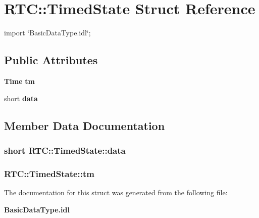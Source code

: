 \section{RTC::TimedState Struct Reference}
\label{structRTC_1_1TimedState}


{\ttfamily import \char`\"{}BasicDataType.idl\char`\"{};}

\subsection*{Public Attributes}
\begin{DoxyCompactItemize}
\item 
{\bf Time} {\bf tm}
\item 
short {\bf data}
\end{DoxyCompactItemize}


\subsection{Member Data Documentation}
\subsubsection[{data}]{\setlength{\rightskip}{0pt plus 5cm}short {\bf RTC::TimedState::data}}\label{structRTC_1_1TimedState_ac5a52665ab3dc6b8d92a68486c93745e}
\subsubsection[{tm}]{ {\bf RTC::TimedState::tm}}\label{structRTC_1_1TimedState_a3d685c8b4f9db1ed6734b7358ab063c8}


The documentation for this struct was generated from the following file:\begin{DoxyCompactItemize}
\item 
{\bf BasicDataType.idl}\end{DoxyCompactItemize}
